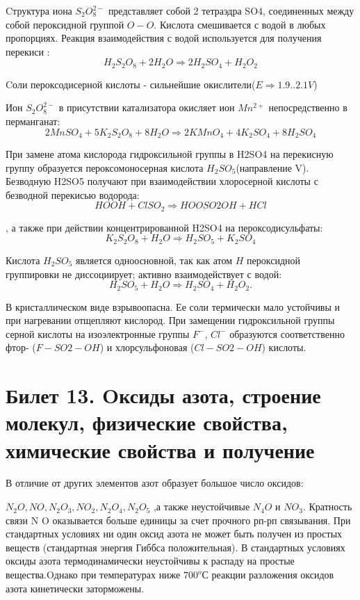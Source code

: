 \documentclass[11pt]{article}
\begin{document}
Cтруктура иона $S_2O_8^{2-}$ представляет собой 2 тетраэдра SO4, соединенных между собой пероксидной
группой $O-O$. Кислота смешивается с водой в любых пропорциях. Реакция взаимодействия с водой
используется для получения перекиси :
$$H_2S_2O_8 + 2H_2O \Rightarrow 2H_2SO_4 + H_2O_2$$

Cоли пероксодисерной кислоты - сильнейшие окислители($E\Rightarrow1.9..2.1V$)

Ион $S_2O_8 ^{2-}$ в присутствии катализатора окисляет ион $Mn^{2+}$ непосредственно в перманганат:
$$2MnSO_4 + 5K_2S_2O_8 + 8H_2O \Rightarrow 2KMnO_4 + 4K_2SO_4 + 8H_2SO_4$$

При замене атома кислорода гидроксильной группы в H2SO4 на перекисную группу образуется пероксомоносерная кислота $H_2SO_5$(направление V). Безводную H2SO5 получают при взаимодействии хлоросерной кислоты с безводной перекисью водорода: 
$$HOOH + ClSO_2 \Rightarrow HOOSO2OH +HCl$$

, а также при действии концентрированной H2SO4 на пероксодисульфаты:
$$K_2S_2O_8 + H_2O \Rightarrow H_2SO_5 + K_2SO_4$$

Кислота $H_2SO_5$ является одноосновной, так как атом $H$ пероксидной группировки не диссоциирует; активно взаимодействует с водой: 
$$H_2SO_5 + H_2O \Rightarrow H_2SO_4 + H_2O_2.$$
 
 В кристаллическом виде взрывоопасна. Ее соли термически мало устойчивы и при нагревании отщепляют кислород. При замещении гидроксильной группы серной кислоты на изоэлектронные группы $F^-$, $Cl^-$ образуются
соответственно фтор- ($F-SO2-OH$) и хлорсульфоновая ($Cl-SO2-OH$) кислоты.


\section{Билет 13. Oксиды азота, строение молекул, физические свойства, химические свойства и получение} 

В отличие от других элементов азот образует большое число оксидов: 

$N _2 O,NO,N _2 O _3 ,NO _2 ,N _2 O _4 ,N _2 O _5$ ,а также неустойчивые $N _4 O$ и $NO _3$.
 Кратность связи N O оказывается больше единицы за счет прочного рп-рп связывания. При стандартных условиях ни один оксид азота не может быть получен из простых веществ (стандартная энергия Гиббса положительная). В стандартных условиях оксиды азота термодинамически неустойчивы к распаду на простые вещества.Oднако при температурах ниже $700 ^oС$ реакции разложения оксидов азота кинетически заторможены.
 
\end{document}
